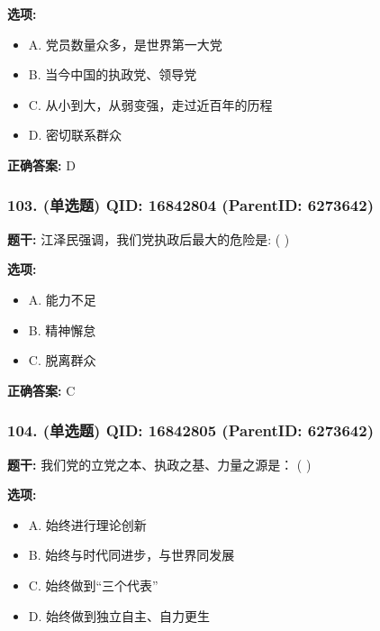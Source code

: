 \documentclass[12pt,UTF8]{ctexart}
\begin{document}
\textbf{选项:}
\begin{itemize}[leftmargin=*]

  \item A. 党员数量众多，是世界第一大党

  \item B. 当今中国的执政党、领导党

  \item C. 从小到大，从弱变强，走过近百年的历程

  \item D. 密切联系群众

\end{itemize}

\textbf{正确答案:}
D

\vspace{0.3em}\hrulefill\vspace{0.7em}

\subsubsection*{103. (单选题) \small QID: 16842804 (ParentID: 6273642)}

\textbf{题干:}
江泽民强调，我们党执政后最大的危险是: ( )



\textbf{选项:}
\begin{itemize}[leftmargin=*]

  \item A. 能力不足

  \item B. 精神懈怠

  \item C. 脱离群众

\end{itemize}

\textbf{正确答案:}
C

\vspace{0.3em}\hrulefill\vspace{0.7em}

\subsubsection*{104. (单选题) \small QID: 16842805 (ParentID: 6273642)}

\textbf{题干:}
我们党的立党之本、执政之基、力量之源是： ( )



\textbf{选项:}
\begin{itemize}[leftmargin=*]

  \item A. 始终进行理论创新

  \item B. 始终与时代同进步，与世界同发展

  \item C. 始终做到“三个代表”

  \item D. 始终做到独立自主、自力更生

\end{itemize}
\end{document}
